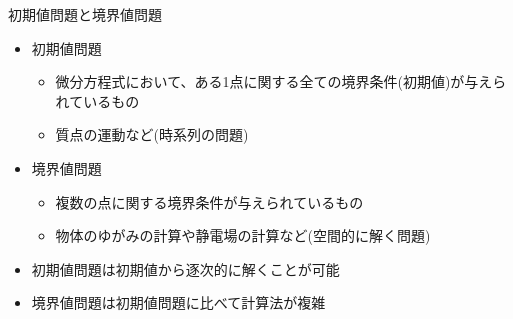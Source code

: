 \begin{frame}[t,fragile]{初期値問題と境界値問題}
  \begin{itemize}
    \setlength{\itemsep}{1em}
  \item 初期値問題
    \begin{itemize}
    \item 微分方程式において、ある1点に関する全ての境界条件(初期値)が与えられているもの
    \item 質点の運動など(時系列の問題)
  \end{itemize}
  \item 境界値問題
    \begin{itemize}
    \item 複数の点に関する境界条件が与えられているもの
    \item 物体のゆがみの計算や静電場の計算など(空間的に解く問題)
  \end{itemize}
  \item 初期値問題は初期値から逐次的に解くことが可能
  \item 境界値問題は初期値問題に比べて計算法が複雑
  \end{itemize}
\end{frame}
